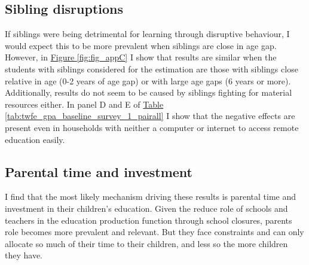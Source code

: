 \subsection{Sibling disruptions}

If siblings were being detrimental for learning through disruptive behaviour, I would expect this to be more prevalent when siblings are close in age gap. However, in \hyperref[fig:fig_appC]{Figure \ref{fig:fig_appC}} I show that results are similar when the students with siblings considered for the estimation are those with siblings close relative in age (0-2 years of age gap) or with large age gaps (6 years or more). Additionally, results do not seem to be caused by siblings fighting for material resources either. In panel D and E of \hyperref[tab:twfe_gpa_baseline_survey_1_pairall]{Table \ref{tab:twfe_gpa_baseline_survey_1_pairall}} I show that the negative effects are present even in households with neither a computer or internet to access remote education easily.





\subsection{Parental time and investment}

I find that the most likely mechanism driving these results is parental time and investment in their children's education. Given the reduce role of schools and teachers in the education production function through school closures, parents role becomes more prevalent and relevant. But they face constraints and can only allocate so much of their time to their children, and less so the more children they have.

